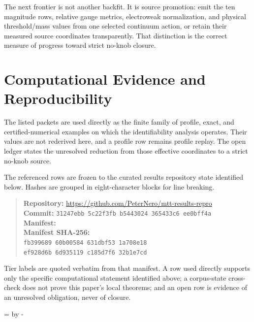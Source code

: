\documentclass[11pt]{article}
\begin{document}
The next frontier is not another backfit. It is source promotion: emit the ten
magnitude rows, relative gauge metrics, electroweak normalization, and
physical threshold/mass values from one selected continuum action, or retain
their measured source coordinates transparently. That distinction is the
correct measure of progress toward strict no-knob closure.

\section*{Computational Evidence and Reproducibility}
The listed packets are used directly as the finite family of profile, exact, and certified-numerical examples on which the identifiability analysis operates. Their values are not rederived here, and a profile row remains profile replay. The open ledger states the unresolved reduction from those effective coordinates to a strict no-knob source.

The referenced rows are frozen to the curated results repository state identified below. Hashes are grouped in eight-character blocks for line breaking.
\begin{quote}\small
\textbf{Repository:} \url{https://github.com/PeterNero/mtt-results-repro}\\
\textbf{Commit:} \texttt{31247ebb 5c22f3fb b5443024 365433c6 ee0bff4a}\\
\textbf{Manifest:} \\
\textbf{Manifest SHA-256:}\\
\texttt{fb399689 60b00584 631dbf53 1a708e18}\\
\texttt{ef928d6b 6d935119 c185d7f6 32b1e7cd}
\end{quote}

Tier labels are quoted verbatim from that manifest. A row used directly supports only the specific computational statement identified above; a corpus-state cross-check does not prove this paper's local theorems; and an open row is evidence of an unresolved obligation, never of closure.

\par\begingroup{}=\pagegoal\advance{} by -\pagetotal\ifdim\dimen0<7\baselineskip\newpage\fi\endgroup
\end{document}
